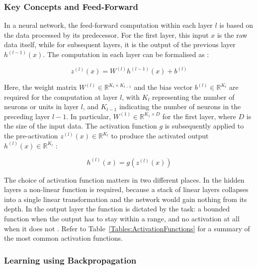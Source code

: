 \subsubsection{Key Concepts and Feed-Forward}

In a neural network, the feed-forward computation within each layer \( l \) is based on the data processed by its predecessor. For the first layer, this input \( x \) is the raw data itself, while for subsequent layers, it is the output of the previous layer \( h^{(l-1)}(x) \). The computation in each layer can be formalised as \cite{goodfellow_deep_2016}:

\begin{equation}
z^{(l)}(x) = W^{(l)} h^{(l-1)}(x) + b^{(l)}
\end{equation}

Here, the weight matrix \( W^{(l)} \in \mathbb{R}^{K_l \times K_{l-1}} \) and the bias vector \( b^{(l)} \in \mathbb{R}^{K_l} \) are required for the computation at layer \( l \), with \( K_l \) representing the number of neurons or units in layer \( l \), and \( K_{l-1} \) indicating the number of neurons in the preceding layer \( l-1 \). In particular, \( W^{(1)} \in \mathbb{R}^{K_1 \times D} \) for the first layer, where \( D \) is the size of the input data. The activation function \( g \) is subsequently applied to the pre-activation \( z^{(l)}(x) \in \mathbb{R}^{K_l} \) to produce the activated output \( h^{(l)}(x) \in \mathbb{R}^{K_l} \) \cite{goodfellow_deep_2016}:

\begin{equation}
h^{(l)}(x) = g(z^{(l)}(x))
\end{equation}

The choice of activation function matters in two different places. In the hidden layers a non-linear function is required, because a stack of linear layers collapses into a single linear transformation and the network would gain nothing from its depth. In the output layer the function is dictated by the task: a bounded function when the output has to stay within a range, and no activation at all when it does not \cite{goodfellow_deep_2016}. Refer to Table~\ref{Tables:ActivationFunctions} for a summary of the most common activation functions.



\subsubsection{Learning using Backpropagation}


